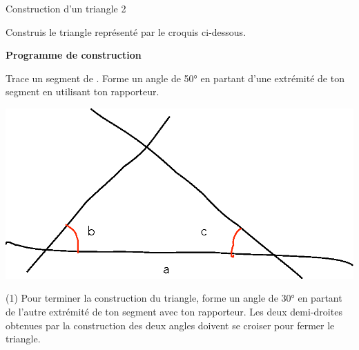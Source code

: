 \documentclass[a4paper,11pt]{report}
\begin{document}
\begin{resolu}
{Construction d'un triangle 2}{Construis le triangle représenté par le croquis ci-dessous.

\vspace{-0.5cm}
\begin{minipage}[t]{0.62\textwidth}{
\vspace{0pt}
{\bf Programme de construction}
	\vspace{-0.5cm}
\begin{tasks}[after-item-skip = 0.3em]
	\task Trace un segment  de .
\task Forme un angle de 50° en partant d'une extrémité de ton segment en utilisant ton rapporteur. 
\end{tasks}
}
\end{minipage}
\begin{minipage}[t]{0.38\textwidth}{
\vspace{0pt}
\begin{center}
\begin{psfrags}
\includegraphics[scale=0.4, angle=180]{media/es-30/triangleACA.eps}
\end{psfrags}
\end{center}
}
\end{minipage}
\begin{tasks}(1)
	\task[c)] Pour terminer la construction du triangle, forme un angle de 30° en partant de l'autre extrémité de ton segment avec ton rapporteur. Les deux demi-droites obtenues par la construction des deux angles doivent se croiser pour fermer le triangle.
\end{tasks}
\vspace{-0.3cm}
}
\end{resolu}
\end{document}
